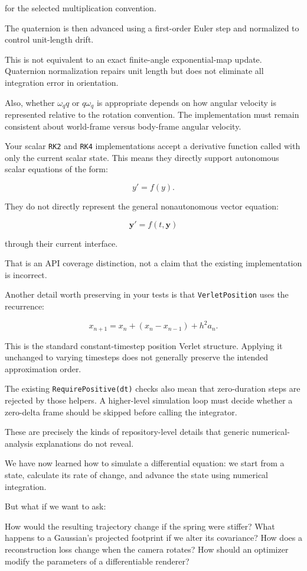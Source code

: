 for the selected multiplication convention.

The quaternion is then advanced using a first-order Euler step and normalized to control unit-length drift.

This is not equivalent to an exact finite-angle exponential-map update. Quaternion normalization repairs unit length but does not eliminate all integration error in orientation.

Also, whether \(\omega_q q\) or \(q\omega_q\) is appropriate depends on how angular velocity is represented relative to the rotation convention. The implementation must remain consistent about world-frame versus body-frame angular velocity.

Your scalar \texttt{RK2} and \texttt{RK4} implementations accept a derivative function called with only the current scalar state. This means they directly support autonomous scalar equations of the form:

\[
y'=f(y).
\]

They do not directly represent the general nonautonomous vector equation:

\[
\mathbf y'=f(t,\mathbf y)
\]

through their current interface.

That is an API coverage distinction, not a claim that the existing implementation is incorrect.

Another detail worth preserving in your tests is that \texttt{VerletPosition} uses the recurrence:

\[
x_{n+1}=x_n+(x_n-x_{n-1})+h^2a_n.
\]

This is the standard constant-timestep position Verlet structure. Applying it unchanged to varying timesteps does not generally preserve the intended approximation order.

The existing \texttt{RequirePositive(dt)} checks also mean that zero-duration steps are rejected by those helpers. A higher-level simulation loop must decide whether a zero-delta frame should be skipped before calling the integrator.

These are precisely the kinds of repository-level details that generic numerical-analysis explanations do not reveal.

We have now learned how to simulate a differential equation: we start from a state, calculate its rate of change, and advance the state using numerical integration.

But what if we want to ask:

How would the resulting trajectory change if the spring were stiffer? What happens to a Gaussian's projected footprint if we alter its covariance? How does a reconstruction loss change when the camera rotates? How should an optimizer modify the parameters of a differentiable renderer?

